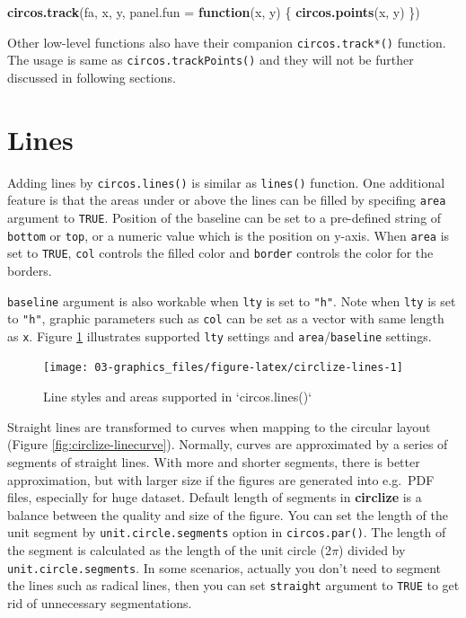 \documentclass[]{book}
\newenvironment{Shaded}{\begin{snugshade}}{\end{snugshade}}
\newcommand{\KeywordTok}[1]{\textcolor[rgb]{0.13,0.29,0.53}{\textbf{#1}}}
\newcommand{\DataTypeTok}[1]{\textcolor[rgb]{0.13,0.29,0.53}{#1}}
\newcommand{\ControlFlowTok}[1]{\textcolor[rgb]{0.13,0.29,0.53}{\textbf{#1}}}
\newcommand{\NormalTok}[1]{#1}
\begin{document}
\begin{Shaded}
\begin{Highlighting}[]
\KeywordTok{circos.track}\NormalTok{(fa, x, y, }\DataTypeTok{panel.fun =} \ControlFlowTok{function}\NormalTok{(x, y) \{}
    \KeywordTok{circos.points}\NormalTok{(x, y)}
\NormalTok{\})}
\end{Highlighting}
\end{Shaded}

Other low-level functions also have their companion
\texttt{circos.track*()} function. The usage is same as
\texttt{circos.trackPoints()} and they will not be further discussed in
following sections.

\section{Lines}\label{lines}

Adding lines by \texttt{circos.lines()} is similar as \texttt{lines()}
function. One additional feature is that the areas under or above the
lines can be filled by specifing \texttt{area} argument to
\texttt{TRUE}. Position of the baseline can be set to a pre-defined
string of \texttt{bottom} or \texttt{top}, or a numeric value which is
the position on y-axis. When \texttt{area} is set to \texttt{TRUE},
\texttt{col} controls the filled color and \texttt{border} controls the
color for the borders.

\texttt{baseline} argument is also workable when \texttt{lty} is set to
\texttt{"h"}. Note when \texttt{lty} is set to \texttt{"h"}, graphic
parameters such as \texttt{col} can be set as a vector with same length
as \texttt{x}. Figure \ref{fig:circlize-lines} illustrates supported
\texttt{lty} settings and \texttt{area}/\texttt{baseline} settings.

\begin{figure}

{\centering \texttt{[image: 03-graphics\_files/figure-latex/circlize-lines-1]} 

}

\caption{Line styles and areas supported in `circos.lines()`}\label{fig:circlize-lines}
\end{figure}

Straight lines are transformed to curves when mapping to the circular
layout (Figure \ref{fig:circlize-linecurve}). Normally, curves are
approximated by a series of segments of straight lines. With more and
shorter segments, there is better approximation, but with larger size if
the figures are generated into e.g.~PDF files, especially for huge
dataset. Default length of segments in \textbf{circlize} is a balance
between the quality and size of the figure. You can set the length of
the unit segment by \texttt{unit.circle.segments} option in
\texttt{circos.par()}. The length of the segment is calculated as the
length of the unit circle (2\(\pi\)) divided by
\texttt{unit.circle.segments}. In some scenarios, actually you don't
need to segment the lines such as radical lines, then you can set
\texttt{straight} argument to \texttt{TRUE} to get rid of unnecessary
segmentations.
\end{document}
